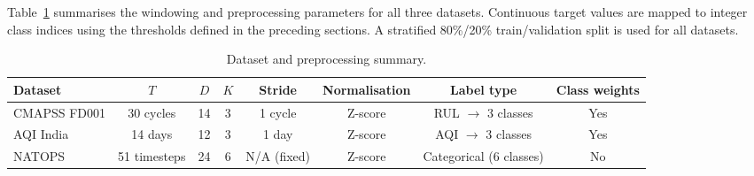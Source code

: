 Table~\ref{tab:dataset_summary} summarises the windowing and preprocessing parameters for all three datasets. Continuous target values are mapped to integer class indices using the thresholds defined in the preceding sections. A stratified 80\%/20\% train/validation split is used for all datasets.

\begin{table}[htbp]
\centering
\caption{Dataset and preprocessing summary.}
\label{tab:dataset_summary}
\begin{adjustbox}{max width=\textwidth}
\begin{tabular}{lccccccc}
\toprule
\textbf{Dataset} & \textbf{$T$} & \textbf{$D$} & \textbf{$K$} & \textbf{Stride} & \textbf{Normalisation} & \textbf{Label type} & \textbf{Class weights} \\
\midrule
CMAPSS FD001 & 30 cycles    & 14 & 3 & 1 cycle     & Z-score & RUL $\to$ 3 classes     & Yes \\
AQI India    & 14 days      & 12 & 3 & 1 day       & Z-score & AQI $\to$ 3 classes     & Yes \\
NATOPS       & 51 timesteps & 24 & 6 & N/A (fixed) & Z-score & Categorical (6 classes) & No  \\
\bottomrule
\end{tabular}
\end{adjustbox}
\end{table}
